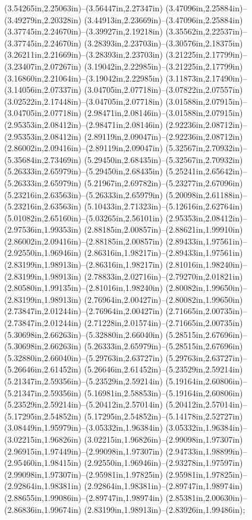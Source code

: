 (3.54265in,2.25063in)--(3.56447in,2.27347in) (3.47096in,2.25884in)--(3.49279in,2.20328in) (3.44913in,2.23669in)--(3.47096in,2.25884in) (3.37745in,2.24670in)--(3.39927in,2.19218in) (3.35562in,2.22537in)--(3.37745in,2.24670in) (3.28393in,2.23703in)--(3.30576in,2.18375in) (3.26211in,2.21669in)--(3.28393in,2.23703in) (3.21225in,2.17799in)--(3.23407in,2.07267in) (3.19042in,2.22985in)--(3.21225in,2.17799in) (3.16860in,2.21064in)--(3.19042in,2.22985in) (3.11873in,2.17490in)--(3.14056in,2.07337in) (3.04705in,2.07718in)--(3.07822in,2.07557in) (3.02522in,2.17448in)--(3.04705in,2.07718in) (3.01588in,2.07915in)--(3.04705in,2.07718in) (2.98471in,2.08146in)--(3.01588in,2.07915in) (2.95353in,2.08412in)--(2.98471in,2.08146in) (2.92236in,2.08712in)--(2.95353in,2.08412in) (2.89119in,2.09047in)--(2.92236in,2.08712in) (2.86002in,2.09416in)--(2.89119in,2.09047in) (5.32567in,2.70932in)--(5.35684in,2.73469in) (5.29450in,2.68435in)--(5.32567in,2.70932in) (5.26333in,2.65979in)--(5.29450in,2.68435in) (5.25241in,2.65642in)--(5.26333in,2.65979in) (5.21967in,2.69782in)--(5.23277in,2.67096in) (5.23216in,2.63563in)--(5.26333in,2.65979in) (5.20098in,2.61188in)--(5.23216in,2.63563in) (5.10433in,2.71323in)--(5.12616in,2.62764in) (5.01082in,2.65160in)--(5.03265in,2.56101in) (2.95353in,2.08412in)--(2.97536in,1.99353in) (2.88185in,2.00857in)--(2.88621in,1.99910in) (2.86002in,2.09416in)--(2.88185in,2.00857in) (2.89433in,1.97561in)--(2.92550in,1.96946in) (2.86316in,1.98217in)--(2.89433in,1.97561in) (2.83199in,1.98913in)--(2.86316in,1.98217in) (2.81016in,1.98240in)--(2.83199in,1.98913in) (2.78833in,2.02716in)--(2.79270in,2.01821in) (2.80580in,1.99135in)--(2.81016in,1.98240in) (2.80082in,1.99650in)--(2.83199in,1.98913in) (2.76964in,2.00427in)--(2.80082in,1.99650in) (2.73847in,2.01244in)--(2.76964in,2.00427in) (2.71665in,2.00735in)--(2.73847in,2.01244in) (2.71228in,2.01574in)--(2.71665in,2.00735in) (5.30698in,2.66263in)--(5.32880in,2.66040in) (5.28515in,2.67696in)--(5.30698in,2.66263in) (5.26333in,2.65979in)--(5.28515in,2.67696in) (5.32880in,2.66040in)--(5.29763in,2.63727in) (5.29763in,2.63727in)--(5.26646in,2.61452in) (5.26646in,2.61452in)--(5.23529in,2.59214in) (5.21347in,2.59356in)--(5.23529in,2.59214in) (5.19164in,2.60806in)--(5.21347in,2.59356in) (5.16981in,2.58853in)--(5.19164in,2.60806in) (5.23529in,2.59214in)--(5.20412in,2.57014in) (5.20412in,2.57014in)--(5.17295in,2.54852in) (5.17295in,2.54852in)--(5.14178in,2.52727in) (3.08449in,1.95979in)--(3.05332in,1.96384in) (3.05332in,1.96384in)--(3.02215in,1.96826in) (3.02215in,1.96826in)--(2.99098in,1.97307in) (2.96915in,1.97449in)--(2.99098in,1.97307in) (2.94733in,1.98899in)--(2.95460in,1.98415in) (2.92550in,1.96946in)--(2.93278in,1.97597in) (2.99098in,1.97307in)--(2.95981in,1.97825in) (2.95981in,1.97825in)--(2.92864in,1.98381in) (2.92864in,1.98381in)--(2.89747in,1.98974in) (2.88655in,1.99086in)--(2.89747in,1.98974in) (2.85381in,2.00630in)--(2.86836in,1.99674in) (2.83199in,1.98913in)--(2.83926in,1.99486in);

